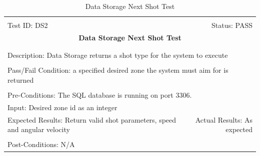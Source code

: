 \documentclass[11pt]{article}
\begin{document}
\begin{center}
\begin{table}[H]
\begin{tabular}{|l r|}\hline&\\[-2mm]
	Test ID: DS2	&Status: PASS\\[-3mm]
	\multicolumn{2}{|c|}{\textbf{\large{Data Storage Next Shot Test}}}\\&\\\hline&\\[-3mm]
	\multicolumn{2}{|p{\textwidth}|}{Description: Data Storage returns a shot type for the system to execute}\\[1mm]\hline&\\[-3mm]
	\multicolumn{2}{|p{\textwidth}|}{Pass/Fail Condition: a specified desired zone the system must aim for is returned}\\[1mm]\hline&\\[-3mm]
	\multicolumn{2}{|p{\textwidth}|}{Pre-Conditions: The SQL database is running on port 3306.}\\[4mm]
	\multicolumn{2}{|p{\textwidth}|}{Input: Desired zone id as an integer}\\[2mm]\hline
	\multicolumn{1}{|p{0.49\textwidth}}{Expected Results: Return valid shot parameters, speed and angular velocity}	&\multicolumn{1}{|p{0.45\textwidth}|}{Actual Results: As expected}\\\hline&\\[-3mm]
	\multicolumn{2}{|p{\textwidth}|}{Post-Conditions: N/A}\\\hline
\end{tabular}
\caption{Data Storage Next Shot Test}
\end{table}
\end{center}
\end{document}
